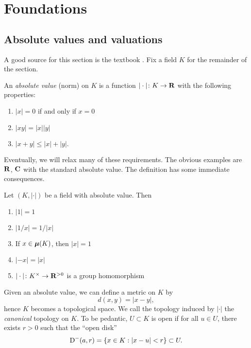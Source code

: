
\section{Foundations}

\subsection{Absolute values and valuations}

A good source for this section is the textbook \cite{engler-prestel}. 
Fix a field $K$ for the remainder of the section. 

\begin{definition}
An \emph{absolute value} (norm) on $K$ is a function $|\cdot|\colon K\to \mathbf{R}$ 
with the following properties: 
\begin{enumerate}
\item
$|x|=0$ if and only if $x=0$

\item
$|xy|=|x| |y|$

\item $|x+y|\leqslant |x|+|y|$. 
\end{enumerate}
\end{definition}

Eventually, we will relax many of these requirements. The obvious examples 
are $\mathbf{R}$, $\mathbf{C}$ with the standard absolute value. The definition has some 
immediate consequences. 

\begin{lemma}
Let $(K,|\cdot|)$ be a field with absolute value. Then 
\begin{enumerate}
\item $|1|=1$
\item $|1/x|=1/|x|$
\item If $x\in {\bm\mu}(K)$, then $|x|=1$
\item $|-x|=|x|$
\item $|\cdot|\colon K^\times\to \mathbf{R}^{>0}$ is a group homomorphism
\end{enumerate}
\end{lemma}

Given an absolute value, we can define a metric on $K$ by 
\[
  d(x,y) = |x-y| ,
\]
hence $K$ becomes a topological space. We call the topology induced by 
$|\cdot|$ the \emph{canonical} topology on $K$. To be pedantic, $U\subset K$ 
is open if for all $u\in U$, there exists $r>0$ such that the ``open disk''
\[
  \operatorname{D}^-(a,r) = \{x\in K:|x-u|<r\}\subset U .
\]

